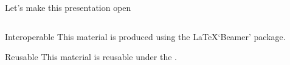 \begin{frame}{Let's make this presentation open}
\begin{columns}[t]
		\begin{column}{.45\textwidth}
		    \centering
		    \begin{block}{Interoperable}
			    This material is produced using the \LaTeX\space `Beamer' package.
		    \end{block}

		    \begin{block}{Reusable}
			    This material is reusable under the .
		    \end{block}
        \end{column}
	\end{columns}
\end{frame}